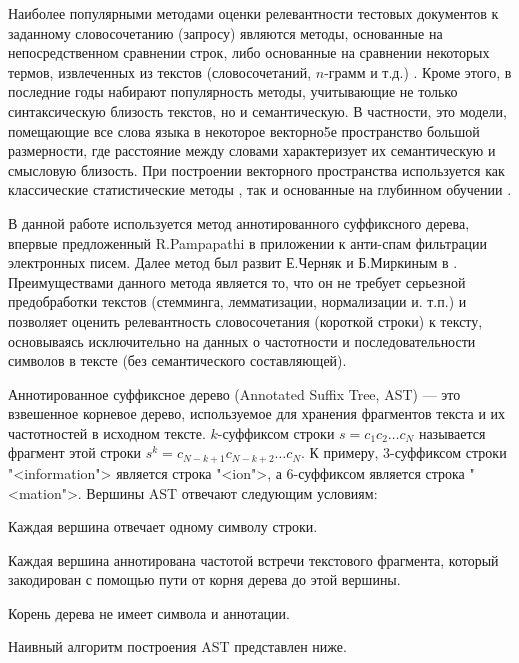 \documentclass[12pt]{article}
\newenvironment{itemize*}%
{\begin{itemize}%
		\setlength{\itemsep}{0pt}%
		\setlength{\parskip}{0pt}}%
	{\end{itemize}}
\begin{document}
Наиболее популярными методами оценки релевантности тестовых документов к заданному словосочетанию (запросу) являются методы, основанные на непосредственном сравнении строк, либо основанные на сравнении некоторых термов, извлеченных из текстов (словосочетаний, $n$-грамм и т.д.) \cite{gomaa2013survey}. Кроме этого, в последние годы набирают популярность методы, учитывающие не только синтаксическую близость текстов, но и семантическую. В частности, это модели, помещающие все слова языка в некоторое векторно5е пространство большой размерности, где расстояние между словами характеризует их семантическую и смысловую близость. При построении векторного пространства используется как классические статистические методы \cite{Erk_2012}, так и основанные на глубинном обучении \cite{li2018word}.

В данной работе используется метод аннотированного суффиксного дерева, впервые предложенный R.Pampapathi \cite{Pampapathi_2006} в приложении к анти-спам фильтрации электронных писем. Далее метод был развит Е.Черняк и Б.Миркиным в \cite{Chernyak_2015, Chernyak_Mirkin_2015}. Преимуществами данного метода является то, что он не требует серьезной предобработки текстов (стемминга, лемматизации, нормализации и. т.п.) и позволяет оценить релевантность словосочетания (короткой строки) к тексту, основываясь исключительно на данных о частотности и последовательности символов в тексте (без семантического составляющей).

Аннотированное суффиксное дерево (Annotated Suffix Tree, AST) --- это взвешенное корневое дерево, используемое для хранения фрагментов текста и их частотностей в исходном тексте. $k$-суффиксом строки $s=c_1c_2\ldots c_N$ называется фрагмент этой строки $s^k=c_{N-k+1}c_{N-k+2}\ldots c_{N}$. К примеру, 3-суффиксом строки "<information"> является строка "<ion">, а 6-суффиксом является строка "<mation">. Вершины AST отвечают следующим условиям:
\begin{itemize*}
	\item Каждая вершина отвечает одному символу строки.
	\item Каждая вершина аннотирована частотой встречи текстового фрагмента, который закодирован с помощью пути от корня дерева до этой вершины.
	\item Корень дерева не имеет символа и аннотации.
\end{itemize*}

Наивный алгоритм построения AST представлен ниже.
\end{document}
